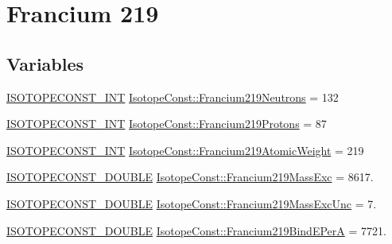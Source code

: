 \hypertarget{group___isotope_const-_francium-_fr219}{}\section{Francium 219}
\label{group___isotope_const-_francium-_fr219}
\subsection*{Variables}
\begin{DoxyCompactItemize}
\item 
\mbox{\hyperlink{group___isotope_const-_macros_ga5f18360b3e99483a35c32d789e62621c}{I\+S\+O\+T\+O\+P\+E\+C\+O\+N\+S\+T\+\_\+\+I\+NT}} \mbox{\hyperlink{group___isotope_const-_francium-_fr219_gaf0f878fb89312cf5648be5482eb548fa}{Isotope\+Const\+::\+Francium219\+Neutrons}} = 132
\item 
\mbox{\hyperlink{group___isotope_const-_macros_ga5f18360b3e99483a35c32d789e62621c}{I\+S\+O\+T\+O\+P\+E\+C\+O\+N\+S\+T\+\_\+\+I\+NT}} \mbox{\hyperlink{group___isotope_const-_francium-_fr219_ga36b1c00aca3b3c350087bdb79ef518a7}{Isotope\+Const\+::\+Francium219\+Protons}} = 87
\item 
\mbox{\hyperlink{group___isotope_const-_macros_ga5f18360b3e99483a35c32d789e62621c}{I\+S\+O\+T\+O\+P\+E\+C\+O\+N\+S\+T\+\_\+\+I\+NT}} \mbox{\hyperlink{group___isotope_const-_francium-_fr219_ga0cc254655ad92ba888193aaf0dcabc99}{Isotope\+Const\+::\+Francium219\+Atomic\+Weight}} = 219
\item 
\mbox{\hyperlink{group___isotope_const-_macros_ga8f45a7272ce02c0b4c65c44636ed719a}{I\+S\+O\+T\+O\+P\+E\+C\+O\+N\+S\+T\+\_\+\+D\+O\+U\+B\+LE}} \mbox{\hyperlink{group___isotope_const-_francium-_fr219_gaefa73252056a0db62fa2e4950fbf5968}{Isotope\+Const\+::\+Francium219\+Mass\+Exc}} = 8617.
\item 
\mbox{\hyperlink{group___isotope_const-_macros_ga8f45a7272ce02c0b4c65c44636ed719a}{I\+S\+O\+T\+O\+P\+E\+C\+O\+N\+S\+T\+\_\+\+D\+O\+U\+B\+LE}} \mbox{\hyperlink{group___isotope_const-_francium-_fr219_ga1d4dca28ea9a0f6e704dcdab2b44a9be}{Isotope\+Const\+::\+Francium219\+Mass\+Exc\+Unc}} = 7.
\item 
\mbox{\hyperlink{group___isotope_const-_macros_ga8f45a7272ce02c0b4c65c44636ed719a}{I\+S\+O\+T\+O\+P\+E\+C\+O\+N\+S\+T\+\_\+\+D\+O\+U\+B\+LE}} \mbox{\hyperlink{group___isotope_const-_francium-_fr219_gae299793654c3dc8d939fd3f4e03aa927}{Isotope\+Const\+::\+Francium219\+Bind\+E\+PerA}} = 7721.
\item 

\end{DoxyCompactItemize}
